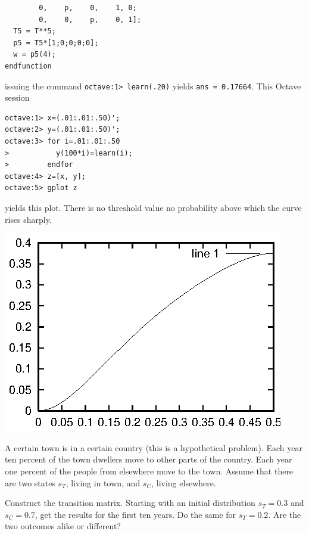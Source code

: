 \begin{exercises}
\begin{answer}
\begin{exparts}
\begin{lstlisting}
        0,    p,    0,    1, 0;
        0,    0,    p,    0, 1]; 
  T5 = T**5;
  p5 = T5*[1;0;0;0;0];
  w = p5(4);
endfunction
\end{lstlisting}
        issuing the command \texttt{octave:1> learn(.20)} yields
        \texttt{ans = 0.17664}.
       \partsitem This Octave session
\begin{lstlisting}
octave:1> x=(.01:.01:.50)';
octave:2> y=(.01:.01:.50)';
octave:3> for i=.01:.01:.50   
>           y(100*i)=learn(i);
>         endfor
octave:4> z=[x, y];
octave:5> gplot z
\end{lstlisting}
        yields this plot.
        There is no threshold value \Dash  no probability above which the
        curve rises sharply.
        \begin{center}
          \includegraphics{learn5.eps}
        \end{center}
      \end{exparts}
    \end{answer}
  \item 
     A certain town is in a certain country 
     (this is a hypothetical problem).
     Each year ten percent of the town dwellers move to other parts of 
     the country.
     Each year one percent of the people from elsewhere move to the town.
     Assume that there are two states $s_T$, living in town, and $s_C$,
     living elsewhere.
     \begin{exparts}
       \partsitem Construct the transition matrix.
       \partsitem Starting with an initial distribution $s_T=0.3$
         and $s_C=0.7$, get the results for the first ten years.
       \partsitem Do the same for $s_T=0.2$.
       \partsitem Are the two outcomes alike or different?
     \end{exparts}

\end{exercises}
